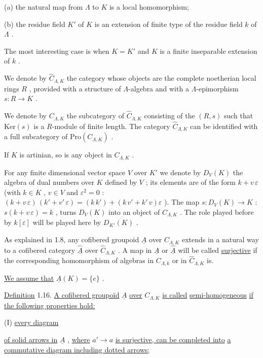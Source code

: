 (a)  the natural map from $\Lambda$ to $K$ is a local homomorphism;

(b)  the residue field $K'$ of $K$ is an extension of finite type of the residue field $k$ of $\Lambda$ .

The most interesting case is when $K = K'$ and $K$ is a finite inseparable extension of $k$ .

We denote by $\hat{C}_{\Lambda,K}$ the category whose objects are the complete noetherian local rings $R$ , provided with a structure of $\Lambda$-algebra and with a $\Lambda$-epimorphism $s : R \longrightarrow K$ .

We denote by $C_{\Lambda,K}$ the subcategory of $\hat{C}_{\Lambda,K}$ consisting of the $(R, s)$ such that $\mathrm{Ker}(s)$ is a $R$-module of finite length. The category $\hat{C}_{\Lambda,K}$ can be identified with a full subcategory of $\mathrm{Pro}(C_{\Lambda,K})$ .

If $K$ is artinian, so is any object in $C_{\Lambda,K}$ .

For any finite dimensional vector space $V$ over $K'$ we denote by $D_V(K)$ the algebra of dual numbers over $K$ defined by $V$ ; its elements are of the form $k + v\,\varepsilon$ (with $k \in K$ , $v \in V$ and $\varepsilon^2 = 0$ : $(k + v\,\varepsilon)\,(k' + v'\,\varepsilon) = (k\,k') + (k\,v' + k'\,v)\varepsilon$  ). The map $s : D_V(K) \to K$ : $s(k + v\,\varepsilon) = k$ , turns $D_V(K)$ into an object of $C_{\Lambda,K}$ . The role played before by $k[\varepsilon]$ will be played here by $D_{K'}(K)$ .

As explained in 1.8, any cofibered groupoid $\underline{A}$ over $C_{\Lambda,K}$ extends in a natural way to a cofibered category $\hat{\underline{A}}$ over $\hat{C}_{\Lambda,K}$ . A map in $\underline{A}$ or $\hat{\underline{A}}$ will be called \underline{surjective} if the corresponding homomorphism of algebras in $C_{\Lambda,k}$ or in $\hat{C}_{\Lambda,K}$ is.


\underline{We assume that} $\underline{A}(K) = \{e\}$ .

\underline{Definition} 1.16.  \underline{A cofibered groupoïd} $\underline{A}$ \underline{over} $C_{\Lambda,K}$ \underline{is called} \underline{semi-homogeneous} \underline{if the following properties hold:}

(I)  \underline{every diagram}

\begin{center}
\end{center}
\underline{of solid arrows in} $\underline{A}$ , \underline{where} $a' \longrightarrow a$ \underline{is surjective, can be completed into} \underline{a commutative diagram including dotted arrows;}

